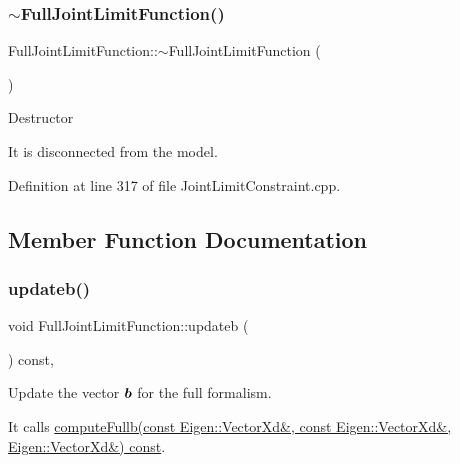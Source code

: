 \hypertarget{classocra_1_1FullJointLimitFunction_a84cc9b5e7efdf78fe9a279ef5940871b}{}\label{classocra_1_1FullJointLimitFunction_a84cc9b5e7efdf78fe9a279ef5940871b} 
\subsubsection{\texorpdfstring{$\sim$\+Full\+Joint\+Limit\+Function()}{~FullJointLimitFunction()}}
{\footnotesize\ttfamily Full\+Joint\+Limit\+Function\+::$\sim$\+Full\+Joint\+Limit\+Function (\begin{DoxyParamCaption}{ }\end{DoxyParamCaption})}

Destructor

It is disconnected from the model. 

Definition at line 317 of file Joint\+Limit\+Constraint.\+cpp.



\subsection{Member Function Documentation}
\hypertarget{classocra_1_1FullJointLimitFunction_a3c9bcab2026535cc5f2c0176552d449d}{}\label{classocra_1_1FullJointLimitFunction_a3c9bcab2026535cc5f2c0176552d449d} 
\subsubsection{\texorpdfstring{updateb()}{updateb()}}
{\footnotesize\ttfamily void Full\+Joint\+Limit\+Function\+::updateb (\begin{DoxyParamCaption}{ }\end{DoxyParamCaption}) const\hspace{0.3cm}{\ttfamily [protected]}, {\ttfamily [virtual]}}

Update the vector $ \mbox{\boldmath${b}$} $ for the full formalism.

It calls \hyperlink{classocra_1_1JointLimitFunction_a254ef5b5095410a802976c95f04fe0a4}{compute\+Fullb(const Eigen\+::\+Vector\+Xd\&, const Eigen\+::\+Vector\+Xd\&, Eigen\+::\+Vector\+Xd\&) const}. 

